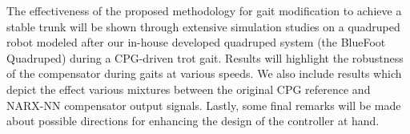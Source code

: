 The effectiveness of the proposed methodology for gait modification to achieve a stable trunk will be shown through extensive simulation studies on a quadruped robot modeled after our in-house developed quadruped system (the BlueFoot Quadruped) during a CPG-driven trot gait. Results will highlight the robustness of the compensator during gaits at various speeds. We also include results which depict the effect various mixtures between the original CPG reference and NARX-NN compensator output signals. Lastly, some final remarks will be made about possible directions for enhancing the design of the controller at hand.